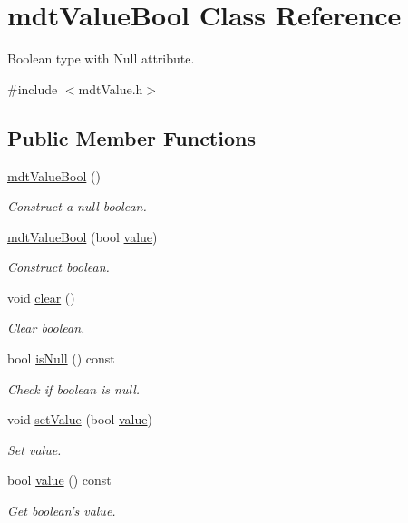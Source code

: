 \hypertarget{classmdt_value_bool}{\section{mdt\-Value\-Bool Class Reference}
\label{classmdt_value_bool}
}


Boolean type with Null attribute.  




{\ttfamily \#include $<$mdt\-Value.\-h$>$}

\subsection*{Public Member Functions}
\begin{DoxyCompactItemize}
\item 
\hyperlink{classmdt_value_bool_aa225217941c44c9b7ce98275fa24a800}{mdt\-Value\-Bool} ()
\begin{DoxyCompactList}\small\item\em Construct a null boolean. \end{DoxyCompactList}\item 
\hyperlink{classmdt_value_bool_aee38a8f251eb4a9d06739192f292af55}{mdt\-Value\-Bool} (bool \hyperlink{classmdt_value_bool_ad34dac053165c5505aac8dff5843625f}{value})
\begin{DoxyCompactList}\small\item\em Construct boolean. \end{DoxyCompactList}\item 
void \hyperlink{classmdt_value_bool_a8c47750d83b60b4120f31eaf35d28e9d}{clear} ()
\begin{DoxyCompactList}\small\item\em Clear boolean. \end{DoxyCompactList}\item 
bool \hyperlink{classmdt_value_bool_afd1b8e5d51bcfd765d69f0d5f1aaddd0}{is\-Null} () const 
\begin{DoxyCompactList}\small\item\em Check if boolean is null. \end{DoxyCompactList}\item 
void \hyperlink{classmdt_value_bool_aff0bbae5ecf874367035a8109ffa4114}{set\-Value} (bool \hyperlink{classmdt_value_bool_ad34dac053165c5505aac8dff5843625f}{value})
\begin{DoxyCompactList}\small\item\em Set value. \end{DoxyCompactList}\item 
bool \hyperlink{classmdt_value_bool_ad34dac053165c5505aac8dff5843625f}{value} () const 
\begin{DoxyCompactList}\small\item\em Get boolean's value. \end{DoxyCompactList}\end{DoxyCompactItemize}


